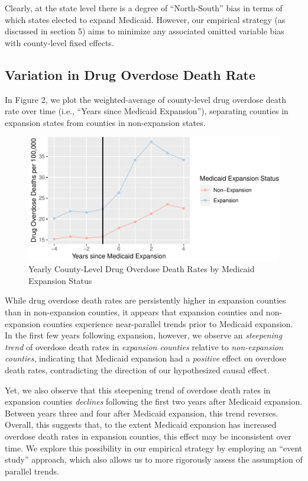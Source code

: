 \documentclass[
  11pt,
]{article}
\begin{document}
Clearly, at the state level there is a degree of ``North-South'' bias in
terms of which states elected to expand Medicaid. However, our empirical
strategy (as discussed in section 5) aims to minimize any associated
omitted variable bias with county-level fixed effects.

\hypertarget{variation-in-drug-overdose-death-rate}{%
\subsection{Variation in Drug Overdose Death
Rate}\label{variation-in-drug-overdose-death-rate}}

In Figure 2, we plot the weighted-average of county-level drug overdose
death rate over time (i.e., ``Years since Medicaid Expansion''),
separating counties in expansion states from counties in non-expansion
states.

\FloatBarrier

\begin{figure}
\centering
\includegraphics{figs/fig2.pdf}
\caption{Yearly County-Level Drug Overdose Death Rates by Medicaid
Expansion Status}
\end{figure}

\FloatBarrier

While drug overdose death rates are persistently higher in expansion
counties than in non-expansion counties, it appears that expansion
counties and non-expansion counties experience near-parallel trends
prior to Medicaid expansion. In the first few years following expansion,
however, we observe an \emph{steepening trend} of overdose death rates
in \emph{expansion counties} relative to \emph{non-expansion counties},
indicating that Medicaid expansion had a \emph{positive} effect on
overdose death rates, contradicting the direction of our hypothesized
causal effect.

Yet, we also observe that this steepening trend of overdose death rates
in expansion counties \emph{declines} following the first two years
after Medicaid expansion. Between years three and four after Medicaid
expansion, this trend reverses. Overall, this suggests that, to the
extent Medicaid expansion has increased overdose death rates in
expansion counties, this effect may be inconsistent over time. We
explore this possibility in our empirical strategy by employing an
``event study'' approach, which also allows us to more rigorously assess
the assumption of parallel trends.
\end{document}
